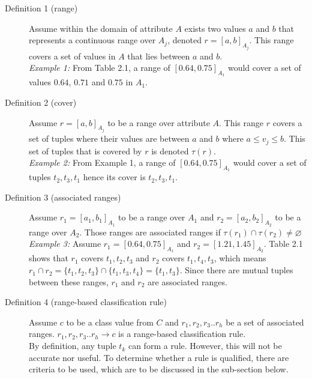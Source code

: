 \begin{description}

\item[Definition 1 (range)]
Assume within the domain of attribute $A$ exists two values $a$ and $b$ that represents a continuous range over $A_j$, denoted $r = [a,b]_{A_j}$. This range covers a set of values in $A$ that lies between $a$ and $b$. \\
\textit{Example 1:} From Table 2.1, a range of $[0.64, 0.75]_{A_1}$ would cover a set of values $0.64$, $0.71$ and $0.75$ in $A_1$.

\bigskip

\item[Definition 2 (cover)]
Assume $r = [a,b]_{A_j}$ to be a range over attribute $A$. This range $r$ covers a set of tuples where their values are between $a$ and $b$ where $a \leq v_j \leq b$. This set of tuples that is covered by $r$ is denoted $\tau(r)$. \\
\textit{Example 2:} From Example 1, a range of $[0.64, 0.75]_{A_1}$ would cover a set of tuples $t_2, t_3, t_1$ hence its cover is $t_2, t_3, t_1$.

\bigskip

\item[Definition 3 (associated ranges)]
Assume $r_1 = [a_1,b_1]_{A_1}$ to be a range over $A_1$ and $r_2 = [a_2,b_2]_{A_2}$ to be a range over $A_2$. Those ranges are associated ranges if $\tau(r_1) \cap \tau(r_2) \neq \varnothing$ 
\textit{Example 3:} Assume $r_1 = [0.64, 0.75]_{A_1}$ and $r_2 = [1.21, 1.45]_{A_2}$. Table 2.1 shows that $r_1$ covers $t_1, t_2, t_3$ and $r_2$ covers $t_1, t_4, t_3$, which means $r_1 \cap r_2 = \{t_1, t_2, t_3\} \cap \{t_1, t_3, t_4\} = \{t_1, t_3\}$. Since there are mutual tuples between these ranges, $r_1$ and $r_2$ are associated ranges. 

\bigskip

\item[Definition 4 (range-based classification rule)]
Assume $c$ to be a class value from $C$ and $r_1, r_2, r_3..r_h$ be a set of  associated ranges. $r_1, r_2, r_3..r_h \rightarrow c$ is a range-based classification rule. \\
By definition, any tuple $t_k$ can form a rule. However, this will not be accurate nor useful. To determine whether a rule is qualified, there are criteria to be used, which are to be discussed in the sub-section below.

\bigskip

\end{description}

